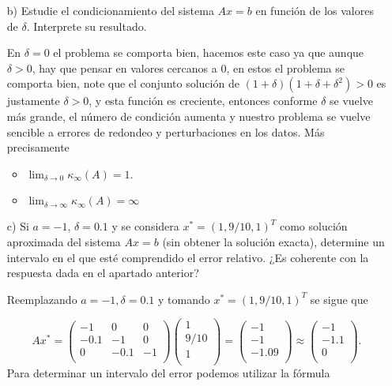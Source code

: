 \begin{enumerate}
\begin{solution}
    \end{solution}
    \item[b)] Estudie el condicionamiento del sistema $Ax = b$ en función de los valores de $\delta$. Interprete su resultado.

    \begin{solution}
        En $\delta=0$ el problema se comporta bien, hacemos este  caso ya que aunque $\delta>0$, hay que pensar en valores cercanos a $0$, en estos el problema se comporta bien, note que el conjunto solución de $(1+\delta)(1+\delta+\delta^2)>0$ es justamente $\delta>0$, y esta función es creciente, entonces conforme $\delta$ se vuelve más grande, el número de condición aumenta y nuestro problema se vuelve sencible a errores de redondeo y perturbaciones en los datos. Más precisamente

        \begin{itemize}
            \item $\lim_{\delta\to 0} \kappa_{\infty}(A)=1$.\\
            \item $\lim_{\delta  \to \infty} \kappa_\infty(A)=\infty$ 
        \end{itemize}
    \end{solution}
    \item[c)] Si $a = -1$, $\delta = 0.1$ y se considera $x^* = (1, 9/10, 1)^T$ como solución aproximada del sistema $Ax = b$ (sin obtener la solución exacta), determine un intervalo en el que esté comprendido el error relativo. ¿Es coherente con la respuesta dada en el apartado anterior?

    \begin{solution}
        Reemplazando $a=-1, \delta=0.1$ y tomando $x^* = (1, 9/10, 1)^T$ se sigue que

        $$Ax^*=\left(
\begin{array}{ccc}
 -1 & 0 & 0 \\
 -0.1 & -1 & 0 \\
 0 & -0.1 & -1 \\
\end{array}
\right)\left(
\begin{array}{c}
 1 \\
 9/10 \\
 1 \\
\end{array}
\right)=\left(
\begin{array}{c}
 -1 \\
 -1 \\
 -1.09 \\
\end{array}
\right)\approx \left(
\begin{array}{c}
 -1 \\
 -1.1 \\
 0 \\
\end{array}
\right).$$
Para determinar un intervalo del error podemos utilizar la fórmula


\end{solution}
\end{enumerate}

